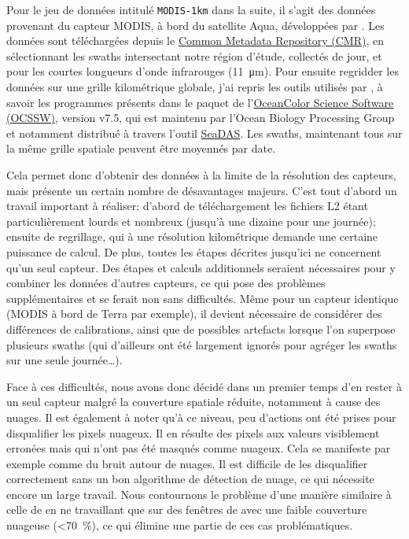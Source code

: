 \documentclass[index]{subfiles}
\begin{document}
Pour le jeu de données intitulé \verb|MODIS-1km| dans la suite, il s'agit des données provenant du capteur \gls{MODIS}, à bord du satellite Aqua, développées par \textcite{sst_modis, kilpatrick_2015}.
Les données sont téléchargées depuis le \href{https://cmr.earthdata.nasa.gov/search/}{Common Metadata Repository (CMR)}, en sélectionnant les swaths intersectant notre région d'étude, collectés de jour, et pour les courtes longueurs d'onde infrarouges (\qty{11}{\um}).
Pour ensuite regridder les données sur une grille kilométrique globale, j'ai repris les outils utilisés par \textcite{liu_2016}, à savoir les programmes présents dans le paquet de l'\href{https://oceandata.sci.gsfc.nasa.gov/ocssw}{OceanColor Science Software (OCSSW)}, version v7.5, qui est maintenu par l'Ocean Biology Processing Group et notamment distribué à travers l'outil \href{https://seadas.gsfc.nasa.gov/}{SeaDAS}.
Les swaths, maintenant tous sur la même grille spatiale peuvent être moyennés par date.

Cela permet donc d'obtenir des données à la limite de la résolution des capteurs, mais présente un certain nombre de désavantages majeurs.
C'est tout d'abord un travail important à réaliser: d'abord de téléchargement les fichiers L2 étant particulièrement lourds et nombreux (jusqu'à une dizaine pour une journée); ensuite de regrillage, qui à une résolution kilométrique demande une certaine puissance de calcul.
De plus, toutes les étapes décrites jusqu'ici ne concernent qu'un seul capteur.
Des étapes et calculs additionnels seraient nécessaires pour y combiner les données d'autres capteurs, ce qui pose des problèmes supplémentaires et se ferait non sans difficultés.
Même pour un capteur identique (\gls{MODIS} à bord de Terra par exemple), il devient nécessaire de considérer des différences de calibrations, ainsi que de possibles artefacts lorsque l'on superpose plusieurs swaths (qui d'ailleurs ont été largement ignorés pour agréger les swaths sur une seule journée\dots).

Face à ces difficultés, nous avons donc décidé dans un premier temps d'en rester à un seul capteur malgré la couverture spatiale réduite, notamment à cause des nuages.
Il est également à noter qu'à ce niveau, peu d'actions ont été prises pour disqualifier les pixels nuageux.
Il en résulte des pixels aux valeurs visiblement erronées mais qui n'ont pas été masqués comme nuageux.
Cela se manifeste par exemple comme du bruit autour de nuages.
Il est difficile de les disqualifier correctement sans un bon algorithme de détection de nuage, ce qui nécessite encore un large travail.
Nous contournons le problème d'une manière similaire à celle de \textcite{liu_2016} en ne travaillant que sur des fenêtres de  avec une faible couverture nuageuse (\textless\qty{70}{\percent}), ce qui élimine une partie de ces cas problématiques.
\end{document}
